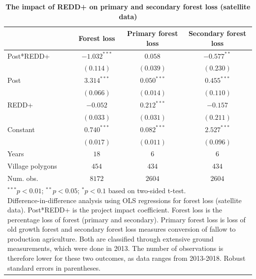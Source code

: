\documentclass[
]{article}
\begin{document}
\begin{table}[h]
\caption{\textbf{The impact of REDD+ on primary and secondary forest loss (satellite data)}}
\begin{center}
\begin{tabular}{l c c c}
\hline
 & Forest loss & Primary forest loss & Secondary forest loss \\
\hline
Post*REDD+       & $-1.032^{***}$ & $0.058$       & $-0.577^{**}$ \\
                 & $(0.114)$      & $(0.039)$     & $(0.230)$     \\
Post             & $3.314^{***}$  & $0.050^{***}$ & $0.455^{***}$ \\
                 & $(0.066)$      & $(0.014)$     & $(0.110)$     \\
REDD+            & $-0.052$       & $0.212^{***}$ & $-0.157$      \\
                 & $(0.033)$      & $(0.031)$     & $(0.211)$     \\
Constant         & $0.740^{***}$  & $0.082^{***}$ & $2.527^{***}$ \\
                 & $(0.017)$      & $(0.011)$     & $(0.096)$     \\
\hline
Years            & $18$           & $6$           & $6$           \\
Village polygons & $454$          & $434$         & $434$         \\
Num. obs.        & $8172$         & $2604$        & $2604$        \\
\hline
\multicolumn{4}{l}{\scriptsize{\parbox{.7\linewidth}{\vspace{2pt}$^{***}p<0.01$; $^{**}p<0.05$; $^{*}p<0.1$ based on two-sided t-test.\\
       Difference-in-difference analysis using OLS regressions for forest loss (satellite data). Post*REDD+ is the project impact coefficient. Forest loss is the percentage loss of forest (primary and secondary). Primary forest loss is loss of old growth forest and secondary forest loss measures conversion of fallow to production agriculture. Both are classified through extensive ground measurements, which were done in 2013. The number of observations is therefore lower for these two outcomes, as data ranges from 2013-2018. Robust standard errors in parentheses.}}}
\end{tabular}
\label{table:coefficients}
\end{center}
\end{table}
\end{document}
